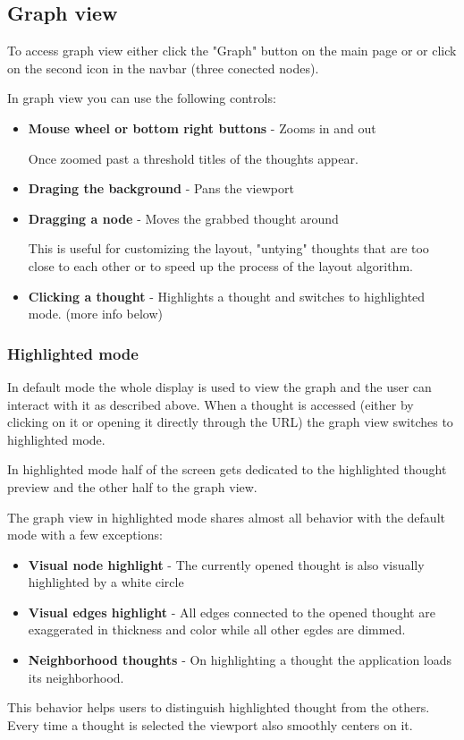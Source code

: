 \subsection{Graph view}
To access graph view either click the "Graph" button on the main page or or click on the second icon in the navbar (three conected nodes). 

In graph view you can use the following controls:
\begin{itemize}
  \item \textbf{Mouse wheel or bottom right buttons} - Zooms in and out

  Once zoomed past a threshold titles of the thoughts appear.
  \item \textbf{Draging the background} - Pans the viewport
  \item \textbf{Dragging a node} - Moves the grabbed thought around
  
  This is useful for customizing the layout, "untying" thoughts that are too close to each other or to speed up the process of the layout algorithm. 
  \item \textbf{Clicking a thought} - Highlights a thought and switches to highlighted mode. (more info below)
\end{itemize}

\subsubsection*{Highlighted mode}

In default mode the whole display is used to view the graph and the user can interact with it as described above.
When a thought is accessed (either by clicking on it or opening it directly through the URL)  the graph view switches to highlighted mode.

In highlighted mode half of the screen gets dedicated to the highlighted thought preview and the other half to the graph view. 

The graph view in highlighted mode shares almost all behavior with the default mode with a few exceptions:
\begin{itemize}
  \item \textbf{Visual node highlight} - The currently opened thought is also visually highlighted by a white circle 
  
  \item \textbf{Visual edges highlight} - All edges connected to the opened thought are exaggerated in thickness and color while all other egdes are dimmed.
  \item \textbf{Neighborhood thoughts} - On highlighting a thought the application loads its neighborhood. 
\end{itemize}
This behavior helps users to distinguish highlighted thought from the others.
Every time a thought is selected the viewport also smoothly centers on it.

